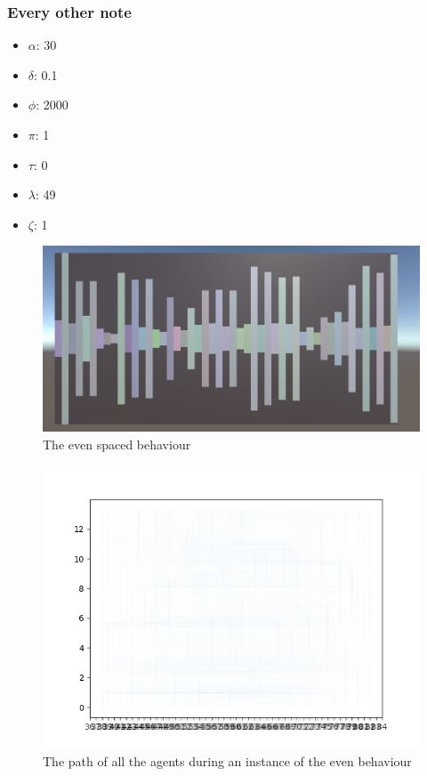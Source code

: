 \documentclass[a4paper,english]{report}
\begin{document}
	
	\subsubsection{Every other note}
	\begin{samepage}\begin{itemize}
		\item $\alpha$: 30
		\item $\delta$: 0.1
		\item $\phi$: 2000
		\item $\pi$: 1
		\item $\tau$: 0
		\item $\lambda$: 49
		\item $\zeta$: 1
	\end{itemize}\end{samepage}
	\begin{figure}
		\centering
		\includegraphics[width=1\linewidth]{even_space}
		\caption{The even spaced behaviour}
		\label{fig:evens}
	\end{figure}
	\begin{figure}
		\centering
		\includegraphics[width=1\linewidth]{even}
		\caption{The path of all the agents during an instance of the even behaviour}
		\label{fig:evenAll}
	\end{figure}
\end{document}
